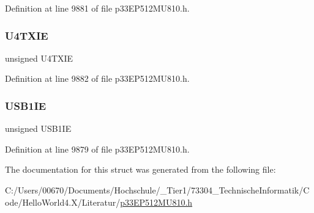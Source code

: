 Definition at line 9881 of file p33\+E\+P512\+M\+U810.\+h.

\mbox{\label{structtag_i_e_c5_b_i_t_s_a0b64eeb5f98d491cd4bb8e95c98182e3}} 
\subsubsection{\texorpdfstring{U4\+T\+X\+IE}{U4TXIE}}
{\footnotesize\ttfamily unsigned U4\+T\+X\+IE}



Definition at line 9882 of file p33\+E\+P512\+M\+U810.\+h.

\mbox{\label{structtag_i_e_c5_b_i_t_s_aada74c031c9eaac776cc9f6ef8645ce1}} 
\subsubsection{\texorpdfstring{U\+S\+B1\+IE}{USB1IE}}
{\footnotesize\ttfamily unsigned U\+S\+B1\+IE}



Definition at line 9879 of file p33\+E\+P512\+M\+U810.\+h.



The documentation for this struct was generated from the following file\+:\begin{DoxyCompactItemize}
\item 
C\+:/\+Users/00670/\+Documents/\+Hochschule/\+\_\+\+Tier1/73304\+\_\+\+Technische\+Informatik/\+Code/\+Hello\+World4.\+X/\+Literatur/\hyperlink{p33_e_p512_m_u810_8h}{p33\+E\+P512\+M\+U810.\+h}\end{DoxyCompactItemize}
